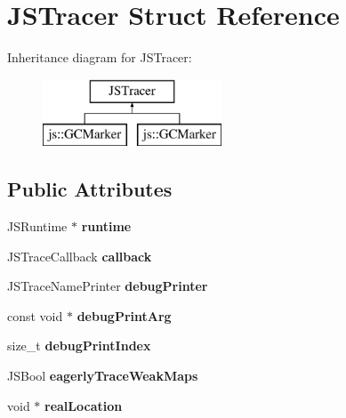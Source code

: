 \hypertarget{struct_j_s_tracer}{\section{J\-S\-Tracer Struct Reference}
\label{struct_j_s_tracer}
}
Inheritance diagram for J\-S\-Tracer\-:\begin{figure}[H]
\begin{center}
\leavevmode
\includegraphics[height=2.000000cm]{struct_j_s_tracer}
\end{center}
\end{figure}
\subsection*{Public Attributes}
\begin{DoxyCompactItemize}
\item 
\hypertarget{struct_j_s_tracer_a66c46ea022406f76dfc4e1234ae9fb60}{J\-S\-Runtime $\ast$ {\bfseries runtime}}\label{struct_j_s_tracer_a66c46ea022406f76dfc4e1234ae9fb60}

\item 
\hypertarget{struct_j_s_tracer_ad92a6168a68d6c26e553fdae829240f6}{J\-S\-Trace\-Callback {\bfseries callback}}\label{struct_j_s_tracer_ad92a6168a68d6c26e553fdae829240f6}

\item 
\hypertarget{struct_j_s_tracer_afcf8ed5afb46a920dc1417aad3354713}{J\-S\-Trace\-Name\-Printer {\bfseries debug\-Printer}}\label{struct_j_s_tracer_afcf8ed5afb46a920dc1417aad3354713}

\item 
\hypertarget{struct_j_s_tracer_acdd18948fc20edb77ac05cebf22ba873}{const void $\ast$ {\bfseries debug\-Print\-Arg}}\label{struct_j_s_tracer_acdd18948fc20edb77ac05cebf22ba873}

\item 
\hypertarget{struct_j_s_tracer_a58b845c180a24d53edf2a36d6de9669f}{size\-\_\-t {\bfseries debug\-Print\-Index}}\label{struct_j_s_tracer_a58b845c180a24d53edf2a36d6de9669f}

\item 
\hypertarget{struct_j_s_tracer_a3d01d68845ceac2c9ef0bb924f04da8c}{J\-S\-Bool {\bfseries eagerly\-Trace\-Weak\-Maps}}\label{struct_j_s_tracer_a3d01d68845ceac2c9ef0bb924f04da8c}

\item 
\hypertarget{struct_j_s_tracer_a45ef951d49eb8ada9f9ba7d9dc502af1}{void $\ast$ {\bfseries real\-Location}}\label{struct_j_s_tracer_a45ef951d49eb8ada9f9ba7d9dc502af1}

\end{DoxyCompactItemize}


